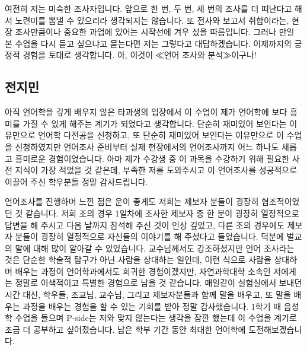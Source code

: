 여전히 저는 미숙한 조사자입니다. 앞으로 한 번, 두 번, 세 번의 조사를 더 떠난다고 해서 노련미를 뽐낼 수 있으리라 생각되지는 않습니다. 또 전사와 보고서 취합이라는, 현장 조사만큼이나 중요한 과업에 있어는 시작선에 겨우 섰을 따름입니다. 그러나 만일 본 수업을 다시 듣고 싶으냐고 묻는다면 저는 그렇다고 대답하겠습니다. 이제까지의 긍정적 경험을 토대로 생각합니다. 아, 이것이 ≪언어 조사와 분석≫이구나!

\subsection{전지민}
아직 언어학을 깊게 배우지 않은 타과생의 입장에서 이 수업이 제가 언어학에 보다 흥미를 가질 수 있게 해주는 계기가 되었다고 생각합니다. 단순히 재미있어 보인다는 이유만으로 언어학 다전공을 신청하고, 또 단순히 재미있어 보인다는 이유만으로 이 수업을 신청하였지만 언어조사 준비부터 실제 현장에서의 언어조사까지 어느 하나도 새롭고 흥미로운 경험이었습니다. 아마 제가 수강생 중 이 과목을 수강하기 위해 필요한 사전 지식이 가장 적었을 것 같은데, 부족한 저를 도와주시고 이 언어조사를 성공적으로 이끌어 주신 학우분들 정말 감사드립니다. 

언어조사를 진행하며 느낀 점은 운이 좋게도 저희는 제보자 분들이 굉장히 협조적이었던 것 같습니다. 저희 조의 경우 1일차에 조사한 제보자 중 한 분이 굉장히 열정적으로 답변을 해 주시고 다음 날까지 참석해 주신 것이 인상 깊었고, 다른 조의 경우에도 제보자 분들이 굉장히 열정적으로 자신들의 이야기를 해 주셨다고 들었습니다. 덕분에 벌교의 말에 대해 많이 알아갈 수 있었습니다. 교수님께서도 강조하셨지만 언어 조사라는 것은 단순한 학술적 탐구가 아닌 사람을 상대하는 일인데, 이런 식으로 사람을 상대하며 배우는 과정이 언어학과에서도 희귀한 경험이겠지만, 자연과학대학 소속인 저에게는 정말로 이색적이고 특별한 경험으로 남을 것 같습니다. 매일같이 실험실에서 보내던 시간 대신, 학우들, 조교님, 교수님, 그리고 제보자분들과 함께 말을 배우고, 또 말을 배우는 과정을 배우는 경험을 할 수 있는 기회를 받아 정말 감사했습니다. 1학기 때 음성학 수업을 들으며 P-side는 저와 맞지 않는다는 생각을 잠깐 했는데 이 수업을 계기로 조금 더 공부하고 싶어졌습니다. 남은 학부 기간 동안 최대한 언어학에 도전해보겠습니다. 